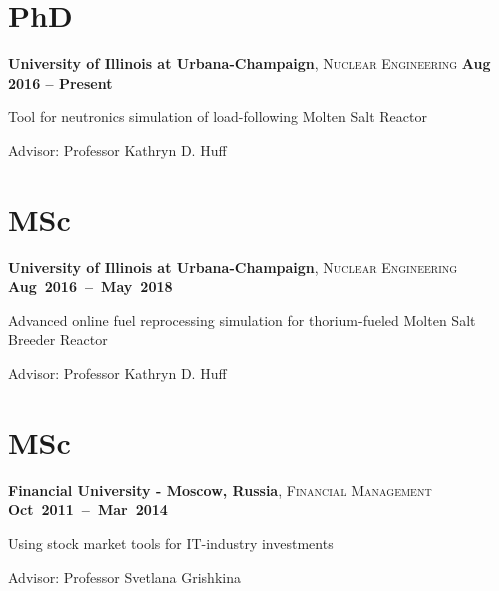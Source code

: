 \documentclass[margin,line]{resume}
\begin{document}
\begin{resume}
    \section{\mysidestyle PhD}
    \textbf{University of Illinois at Urbana-Champaign}, \textsc{Nuclear Engineering}\hfill \textbf{ Aug 2016 -- Present}\vspace{-3mm}\\\vspace{-1mm}%
    \begin{list2}
        \item Tool for neutronics simulation of load-following Molten Salt Reactor
        \item Advisor:  Professor Kathryn D. Huff
    \end{list2}\vspace{-1.5mm}
    \section{\mysidestyle MSc}
    \textbf{University of Illinois at Urbana-Champaign}, \textsc{Nuclear Engineering} \hfill\textbf{\mbox{Aug 2016 -- May 2018}}\vspace{-3mm}\\\vspace{-1mm}%
    \begin{list2}
        \item Advanced online fuel reprocessing simulation for thorium-fueled Molten Salt Breeder Reactor
        \item Advisor:  Professor Kathryn D. Huff
    \end{list2}\vspace{-1.5mm}
    \section{\mysidestyle MSc}
    \textbf{Financial University - Moscow, Russia}, \textsc{Financial Management} \hfill \textbf{\mbox{Oct 2011 -- Mar 2014	}}\vspace{-3mm}\\\vspace{-1mm}%
    \begin{list2}
        \item Using stock market tools for IT-industry investments
        \item Advisor:  Professor Svetlana Grishkina
    \end{list2}\vspace{-1.5mm}

\end{resume}
\end{document}

